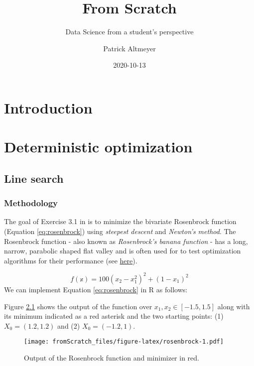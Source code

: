 \documentclass[
]{book}
\title{From Scratch}
\subtitle{Data Science from a student's perspective}
\author{Patrick Altmeyer}
\date{2020-10-13}
\begin{document}
\maketitle

{
\setcounter{tocdepth}{1}
\tableofcontents
}
\hypertarget{intro}{%
\chapter{Introduction}\label{intro}}

\hypertarget{det-opt}{%
\chapter{Deterministic optimization}\label{det-opt}}

\hypertarget{line-search}{%
\section{Line search}\label{line-search}}

\hypertarget{methodology}{%
\subsection{Methodology}\label{methodology}}

The goal of Exercise 3.1 in \citet{nw2006numerical} is to minimize the bivariate Rosenbrock function (Equation \eqref{eq:rosenbrock}) using \emph{steepest descent} and \emph{Newton's method}. The Rosenbrock function - also known as \emph{Rosenbrock's banana function} - has a long, narrow, parabolic shaped flat valley and is often used for to test optimization algorithms for their performance (see \href{https://en.wikipedia.org/wiki/Rosenbrock_function}{here}).

\[
\begin{equation}
  f(\mathbb{x})=100(x_2-x_1^2)^2+(1-x_1)^2 
  \label{eq:rosenbrock}
\end{equation}
\]
We can implement Equation \eqref{eq:rosenbrock} in R as follows:

Figure \ref{fig:rosenbrock} shows the output of the function over \(x_1,x_2 \in [-1.5, 1.5]\) along with its minimum indicated as a red asterisk and the two starting points: (1) \(X_0=(1.2,1.2)\) and (2) \(X_0=(-1.2,1)\).

\begin{figure}
\centering
\texttt{[image: fromScratch\_files/figure-latex/rosenbrock-1.pdf]}
\caption{\label{fig:rosenbrock}Output of the Rosenbrock function and minimizer in red.}
\end{figure}
\end{document}
